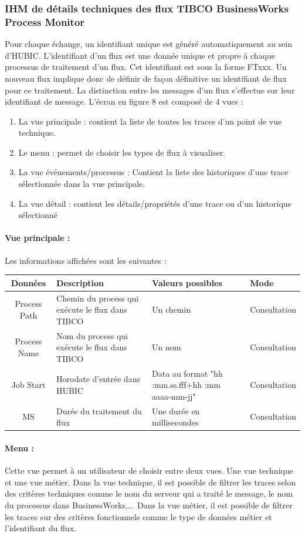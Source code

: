 \subsubsection{IHM de détails techniques des flux TIBCO BusinessWorks Process Monitor}
Pour chaque échange, un identifiant unique est généré automatiquement au sein d'HUBIC.
L'identifiant d'un flux est une donnée unique et propre à chaque processus de traitement d'un
flux. Cet identifiant est sous la forme FTxxx. Un nouveau flux implique donc de définir de façon
définitive un identifiant de flux pour ce traitement.
La distinction entre les messages d'un flux s'effectue sur leur identifiant de message.
L'écran en figure 8 est composé de 4 vues :
\begin{enumerate}
	\item La vue principale : contient la liste de toutes les traces d'un point de vue technique.
	 \item Le menu : permet de choisir les types de flux à visualiser. \item La vue événements/processus : Contient la liste des historiques d'une trace sélectionnée dans la vue principale. \item La vue détail : contient les détails/propriétés d'une trace ou d'un historique sélectionné
\end{enumerate}
\paragraph{Vue principale : }
Les informations affichées sont les suivantes :\\
\noindent
\begin{tabularx}{\textwidth}{|c|M{4cm}|X|M{4cm}|}
	\hline
	Données& Description& Valeurs possibles& Mode\\\hline\hline
	Process Path&
	Chemin du process qui exécute le flux dans TIBCO&
	Un chemin& Consultation\\
	\hline
	Process Name&
	Nom du process qui exécute le flux dans TIBCO&
	Un nom& Consultation\\
	\hline
	Job Start&
	Horodate d'entrée dans HUBIC&
	Data au format "hh :mm.ss.fff+hh :mm aaaa-mm-jj"&
	Consultation\\
	\hline
	MS&
	Durée du traitement du flux&
	Une durée en millisecondes& Consultation\\
	\hline
\end{tabularx}
\paragraph{Menu : }Cette vue permet à un utilisateur de choisir entre deux vues. Une vue technique et une vue métier. Dans la vue technique, il est possible de filtrer les traces selon des critères techniques comme le nom du serveur qui a traité le message, le nom du processus dans BusinessWorks,... Dans la vue métier, il est possible de filtrer les traces sur des critères fonctionnels comme le type de données métier et l'identifiant du flux.

